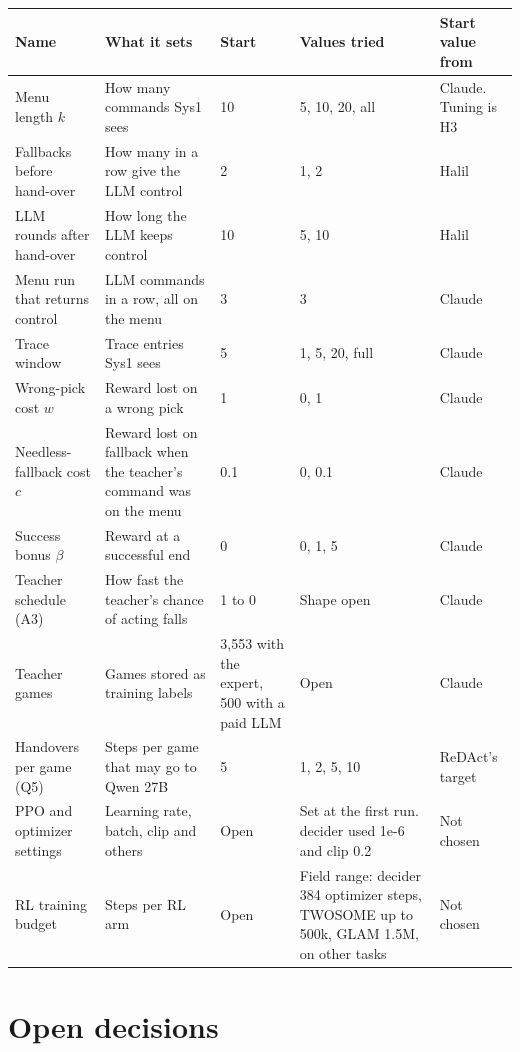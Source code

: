 \documentclass[10pt]{article}
\begin{document}
\begin{table}[H]
\footnotesize
\begin{tabularx}{\linewidth}{@{}P{5.2cm} L P{1.5cm} P{3cm} P{3cm}@{}}
\toprule
Name & What it sets & Start & Values tried & Start value from \\
\midrule
Menu length $k$ & How many commands Sys1 sees & 10 & 5, 10, 20, all & Claude. Tuning is H3 \\
Fallbacks before hand-over & How many in a row give the LLM control & 2 & 1, 2 & Halil \\
LLM rounds after hand-over & How long the LLM keeps control & 10 & 5, 10 & Halil \\
Menu run that returns control & LLM commands in a row, all on the menu & 3 & 3 & Claude \\
Trace window & Trace entries Sys1 sees & 5 & 1, 5, 20, full & Claude \\
Wrong-pick cost $w$ & Reward lost on a wrong pick & 1 & 0, 1 & Claude \\
Needless-fallback cost $c$ & Reward lost on fallback when the teacher's command was on the menu & 0.1 & 0, 0.1 & Claude \\
Success bonus $\beta$ & Reward at a successful end & 0 & 0, 1, 5 & Claude \\
Teacher schedule (A3) & How fast the teacher's chance of acting falls & 1 to 0 & Shape open & Claude \\
Teacher games & Games stored as training labels & 3,553 with the expert, 500 with a paid LLM & Open & Claude \\
Handovers per game (Q5) & Steps per game that may go to Qwen 27B & 5 & 1, 2, 5, 10 & ReDAct's target \\
PPO and optimizer settings & Learning rate, batch, clip and others & Open & Set at the first run. decider used 1e-6 and clip 0.2 & Not chosen \\
RL training budget & Steps per RL arm & Open & Field range: decider 384 optimizer steps, TWOSOME up to 500k, GLAM 1.5M, on other tasks & Not chosen \\
\bottomrule
\end{tabularx}
\end{table}

\section{Open decisions}
\end{document}
